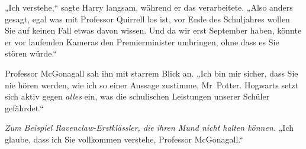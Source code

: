 „Ich verstehe,“ sagte Harry langsam, während er das verarbeitete. „Also anders gesagt, egal was mit Professor Quirrell los ist, vor Ende des Schuljahres wollen Sie auf keinen Fall etwas davon wissen. Und da wir erst September haben, könnte er vor laufenden Kameras den Premierminister umbringen, ohne dass es Sie stören würde.“

Professor McGonagall sah ihn mit starrem Blick an. „Ich bin mir sicher, dass Sie nie hören werden, wie ich so einer Aussage zustimme, Mr~Potter. Hogwarts setzt sich aktiv gegen \emph{alles} ein, was die schulischen Leistungen unserer Schüler gefährdet.“

\emph{Zum Beispiel Ravenclaw-Erstklässler, die ihren Mund nicht halten können.} „Ich glaube, dass ich Sie vollkommen verstehe, Professor McGonagall.“

